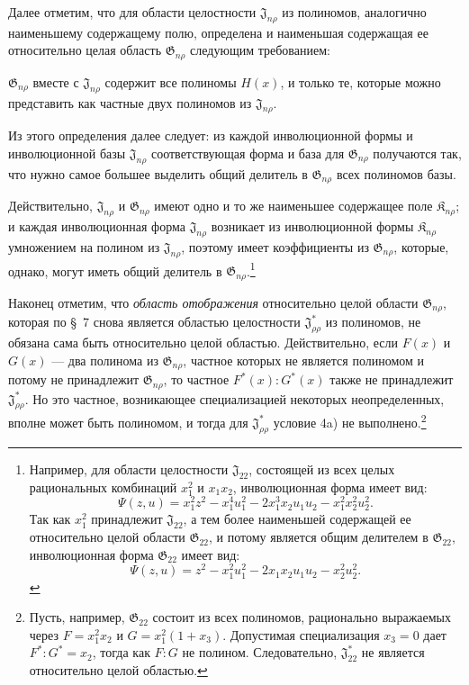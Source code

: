 \documentclass[11pt]{article}
\providecommand{\Kfield}{\mathfrak{K}}
\providecommand{\Jdom}{\mathfrak{J}}
\providecommand{\Gdom}{\mathfrak{G}}
\begin{document}
Далее отметим, что для области целостности $\Jdom_{n\rho}$ из полиномов, аналогично наименьшему содержащему полю, определена и наименьшая содержащая ее относительно целая область $\Gdom_{n\rho}$ следующим требованием:

$\Gdom_{n\rho}$ вместе с $\Jdom_{n\rho}$ содержит все полиномы $H(x)$, и только те, которые можно представить как частные двух полиномов из $\Jdom_{n\rho}$.

Из этого определения далее следует: из каждой инволюционной формы и инволюционной базы $\Jdom_{n\rho}$ соответствующая форма и база для $\Gdom_{n\rho}$ получаются так, что нужно самое большее выделить общий делитель в $\Gdom_{n\rho}$ всех полиномов базы.

Действительно, $\Jdom_{n\rho}$ и $\Gdom_{n\rho}$ имеют одно и то же наименьшее содержащее поле $\Kfield_{n\rho}$; и каждая инволюционная форма $\Jdom_{n\rho}$ возникает из инволюционной формы $\Kfield_{n\rho}$ умножением на полином из $\Jdom_{n\rho}$, поэтому имеет коэффициенты из $\Gdom_{n\rho}$, которые, однако, могут иметь общий делитель в $\Gdom_{n\rho}$.\footnote{Например, для области целостности $\Jdom_{22}$, состоящей из всех целых рациональных комбинаций $x_1^2$ и $x_1x_2$, инволюционная форма имеет вид:
\[
\Psi(z,u)=x_1^2z^2-x_1^4u_1^2-2x_1^3x_2u_1u_2-x_1^2x_2^2u_2^2.
\]
Так как $x_1^2$ принадлежит $\Jdom_{22}$, а тем более наименьшей содержащей ее относительно целой области $\Gdom_{22}$, и потому является общим делителем в $\Gdom_{22}$, инволюционная форма $\Gdom_{22}$ имеет вид:
\[
\Psi(z,u)=z^2-x_1^2u_1^2-2x_1x_2u_1u_2-x_2^2u_2^2.
\]}

Наконец отметим, что \emph{область отображения} относительно целой области $\Gdom_{n\rho}$, которая по \S\ 7 снова является областью целостности $\Jdom^*_{\rho\rho}$ из полиномов, не обязана сама быть относительно целой областью. Действительно, если $F(x)$ и $G(x)$ --- два полинома из $\Gdom_{n\rho}$, частное которых не является полиномом и потому не принадлежит $\Gdom_{n\rho}$, то частное $F^*(x):G^*(x)$ также не принадлежит $\Jdom^*_{\rho\rho}$. Но это частное, возникающее специализацией некоторых неопределенных, вполне может быть полиномом, и тогда для $\Jdom^*_{\rho\rho}$ условие 4a) не выполнено.\footnote{Пусть, например, $\Gdom_{22}$ состоит из всех полиномов, рационально выражаемых через $F=x_1^2x_2$ и $G=x_1^2(1+x_3)$. Допустимая специализация $x_3=0$ дает $F^*:G^*=x_2$, тогда как $F:G$ не полином. Следовательно, $\Jdom^*_{22}$ не является относительно целой областью.}
\end{document}
